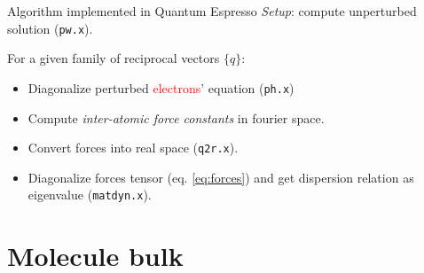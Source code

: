\documentclass[dvipsnames]{beamer}
\newcommand{\electrons}{\textcolor{red}{electrons}}
\begin{document}
		
		
		\begin{frame}{Algorithm implemented in Quantum Espresso}
		\textit{Setup}: compute unperturbed solution (\texttt{pw.x}).
		\par
		\vspace{0.5cm}
		For a given family of reciprocal vectors $\{q\}$:
		\begin{itemize}
		\item<1-> Diagonalize perturbed \electrons ' equation (\texttt{ph.x})
		\item<1-> Compute \textit{inter-atomic force constants} in fourier space.
		\item<2-> Convert forces into real space (\texttt{q2r.x}).
		\item<3-> Diagonalize forces tensor (eq. \ref{eq:forces}) and get dispersion relation as eigenvalue (\texttt{matdyn.x}).
		\end{itemize}
		
		\end{frame}
		
		
		
	\section{Molecule bulk }
	
\end{document}
